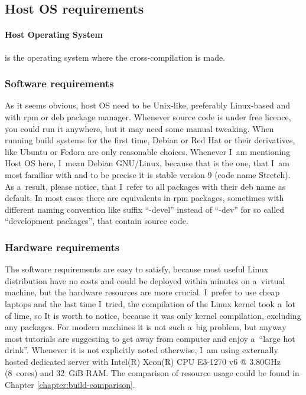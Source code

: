 \documentclass[printmode]{mgr}
\begin{document}
\subsection*{Host OS requirements}

\paragraph{Host Operating System} is the operating system where the cross-compilation is made.

\subsubsection{Software requirements}
As it seems obvious, host OS need to be Unix-like, preferably Linux-based and with rpm or deb package manager. Whenever source code is under free licence, you could run it anywhere, but it may need some manual tweaking. When running build systems for the first time, Debian or Red Hat or their derivatives, like Ubuntu or Fedora are only reasonable choices. Whenever I~am mentioning Host OS here, I~mean Debian GNU/Linux, because that is the one, that I~am most familiar with and to be precise it is stable version 9 (code name Stretch). As a~result, please notice, that I~refer to all packages with their deb name as default. In most cases there are equivalents in rpm packages, sometimes with different naming convention like suffix ``-devel'' instead of ``-dev'' for so called ``development packages'', that contain source code.

\subsubsection{Hardware requirements}
The software requirements are easy to satisfy, because most useful Linux distribution have no costs and could be deployed within minutes on a~virtual machine, but the hardware resources are more crucial. I~prefer to use cheap laptops and the last time I~tried, the compilation of the Linux kernel took a~lot of lime, so It is worth to notice, because it was only kernel compilation, excluding any packages. For modern machines it is not such a~big problem, but anyway most tutorials are suggesting to get away from computer and enjoy a~``large hot drink''. Whenever it is not explicitly noted otherwise, I~am using externally hosted dedicated server with Intel(R) Xeon(R) CPU E3-1270 v6 @ 3.80GHz (8~cores) and 32~GiB RAM. The comparison of resource usage could be found in Chapter \ref{chapter:build-comparison}.
\end{document}

